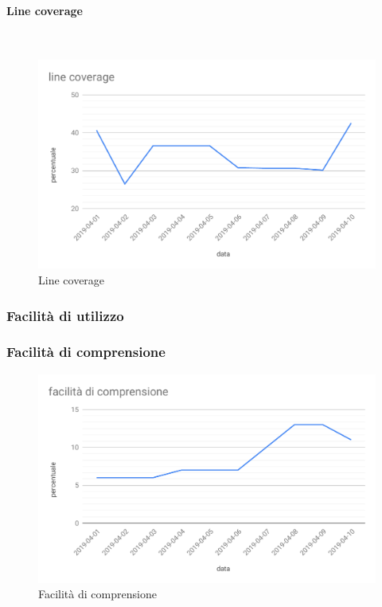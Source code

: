 \paragraph{Line coverage}\mbox{}\\
\begin{figure}[H]
	\centering
	\includegraphics[scale=0.6]{res/images/RQ/line-coverage-RQ.pdf}
	\caption{Line coverage}
\end{figure}

\subsubsection{Facilità di utilizzo}

\subsubsection{Facilità di comprensione} %
\begin{figure}[H]
	\centering
	\includegraphics[scale=0.6]{res/images/RQ/facilita-di-comprensione.pdf}
	\caption{Facilità di comprensione}
\end{figure}

